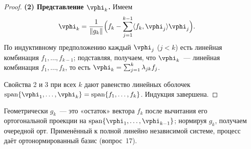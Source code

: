 \begin{proof}
	\textbf{(2) Представление $\vphi_k$.} Имеем
	\[
	\vphi_k = \frac{1}{\|g_k\|}\Bigl( f_k - \sum_{j=1}^{k-1}\langle f_k, \vphi_j\rangle \vphi_j \Bigr).
	\]
	По индуктивному предположению каждый $\vphi_j$ ($j < k$) есть линейная комбинация $f_1, \ldots, f_{k-1}$; подставляя, получаем, что $\vphi_k$~--- линейная комбинация $f_1, \ldots, f_k$, то есть $\vphi_k = \sum_{j=1}^{k}\lambda_{jk} f_j$.

	Свойства 2 и 3 при всех $k$ дают равенство линейных оболочек $\operatorname{span}\{\vphi_1, \ldots, \vphi_k\} = \operatorname{span}\{f_1, \ldots, f_k\}$. Индукция завершена.
\end{proof}

\begin{Remark}{}{}
	Геометрически $g_k$~--- это «остаток» вектора $f_k$ после вычитания его ортогональной проекции на $\operatorname{span}\{\vphi_1, \ldots, \vphi_{k-1}\}$; нормируя $g_k$, получаем очередной орт. Применённый к полной линейно независимой системе, процесс даёт ортонормированный базис (вопрос~17).
\end{Remark}
